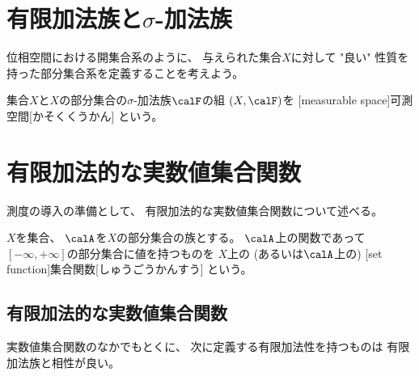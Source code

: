 \documentclass[report]{jlreq}
\begin{document}
\section{
    \texorpdfstring{%
        有限加法族と$\sigma$-加法族%
    }{%
        有限加法族と sigma 加法族%
    }%
}

位相空間における開集合系のように、
与えられた集合$X$に対して "良い" 性質を持った部分集合系を定義することを考えよう。

\begin{definition}[有限加法族]
    \TODO{}
\end{definition}

\begin{definition}
    \TODO{}
\end{definition}

\begin{definition}[可測空間]
    集合$X$と$X$の部分集合の$\sigma$-加法族$\calF$の組
    $(X, \calF)$を
    [measurable space]{可測空間}[かそくくうかん]
    という。
\end{definition}

%
\section{有限加法的な実数値集合関数}

測度の導入の準備として、
有限加法的な実数値集合関数について述べる。

\begin{definition}[集合関数]
    $X$を集合、
    $\calA$を$X$の部分集合の族とする。
    $\calA$上の関数であって
    $[-\infty, +\infty]$の部分集合に値を持つものを
    $X$上の (あるいは$\calA$上の)
    [set function]{集合関数}[しゅうごうかんすう]
    という。
\end{definition}

\subsection{有限加法的な実数値集合関数}

実数値集合関数のなかでもとくに、
次に定義する有限加法性を持つものは
有限加法族と相性が良い。
\end{document}
